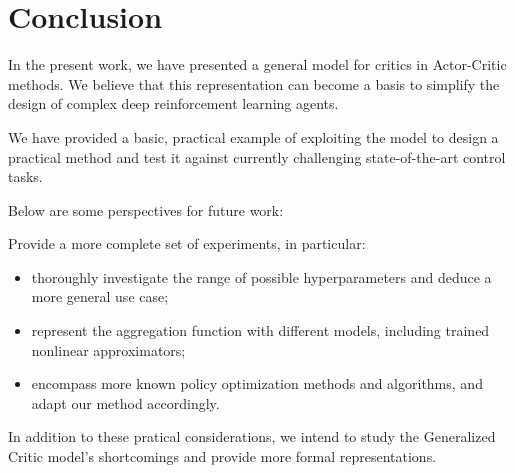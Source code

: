 \section{Conclusion}
\label{sec:conc}
In the present work, we have presented a general model for critics in Actor-Critic methods. We believe that this representation can become a basis to simplify the design of complex deep reinforcement learning agents.

We have provided a basic, practical example of exploiting the model to design a practical method and test it against currently challenging state-of-the-art control tasks.

Below are some perspectives for future work:

Provide a more complete set of experiments, in particular: 
\begin{itemize}
\item thoroughly investigate the range of possible hyperparameters and deduce a more general use case;
\item represent the aggregation function with different models, including trained nonlinear approximators;
\item encompass more known policy optimization methods and algorithms, and adapt our method accordingly.
\end{itemize}

In addition to these pratical considerations, we intend to study the Generalized Critic model's shortcomings and provide more formal representations.



